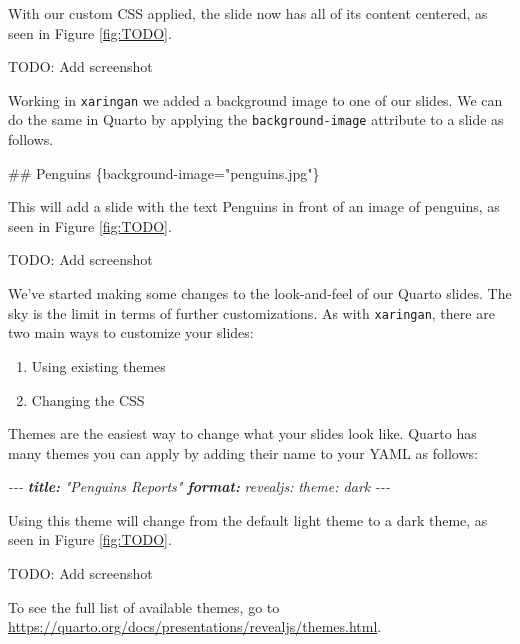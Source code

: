 \documentclass[
]{book}
\newenvironment{Shaded}{\begin{snugshade}}{\end{snugshade}}
\newcommand{\AnnotationTok}[1]{\textcolor[rgb]{0.56,0.35,0.01}{\textbf{\textit{#1}}}}
\newcommand{\CommentTok}[1]{\textcolor[rgb]{0.56,0.35,0.01}{\textit{#1}}}
\newcommand{\FunctionTok}[1]{\textcolor[rgb]{0.00,0.00,0.00}{#1}}
\newcommand{\NormalTok}[1]{#1}
\providecommand{\tightlist}{%
  \setlength{\itemsep}{0pt}\setlength{\parskip}{0pt}}
\begin{document}
With our custom CSS applied, the slide now has all of its content centered, as seen in Figure \ref{fig:TODO}.

TODO: Add screenshot

Working in \texttt{xaringan} we added a background image to one of our slides. We can do the same in Quarto by applying the \texttt{background-image} attribute to a slide as follows.

\begin{Shaded}
\begin{Highlighting}[]
\NormalTok{\#\# Penguins \{background{-}image="penguins}\FunctionTok{.jpg}\NormalTok{"\}}
\end{Highlighting}
\end{Shaded}

This will add a slide with the text Penguins in front of an image of penguins, as seen in Figure \ref{fig:TODO}.

TODO: Add screenshot

We've started making some changes to the look-and-feel of our Quarto slides. The sky is the limit in terms of further customizations. As with \texttt{xaringan}, there are two main ways to customize your slides:

\begin{enumerate}
\def\labelenumi{\arabic{enumi}.}
\tightlist
\item
  Using existing themes
\item
  Changing the CSS
\end{enumerate}

Themes are the easiest way to change what your slides look like. Quarto has many themes you can apply by adding their name to your YAML as follows:

\begin{Shaded}
\begin{Highlighting}[]
\CommentTok{{-}{-}{-}}
\AnnotationTok{title:}\CommentTok{ "Penguins Reports"}
\AnnotationTok{format:}
\CommentTok{  revealjs: }
\CommentTok{    theme: dark}
\CommentTok{{-}{-}{-}}
\end{Highlighting}
\end{Shaded}

Using this theme will change from the default light theme to a dark theme, as seen in Figure \ref{fig:TODO}.

TODO: Add screenshot

To see the full list of available themes, go to \url{https://quarto.org/docs/presentations/revealjs/themes.html}.
\end{document}
